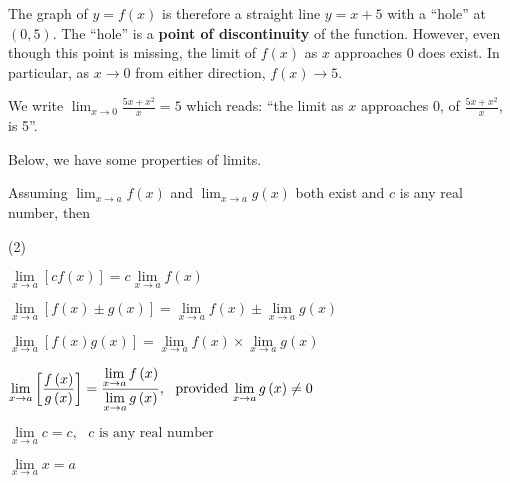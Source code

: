 \documentclass[11pt,a4paper]{book}
\begin{document}
The graph of $y=f\left(x\right)$ is therefore a straight line $y=x+5$
with a ``hole'' at $\left(0,5\right)$. The ``hole'' is a \textbf{point
of discontinuity} of the function.
However, even though this point is missing, the limit of $f\left(x\right)$
as $x$ approaches $0$ does exist. In particular, as $x\to0$ from
either direction, $f\left(x\right)\rightarrow5$.

We write ${\displaystyle \lim_{x\to0}\frac{5x+x^{2}}{x}=5}$ which
reads: ``the limit as $x$ approaches 0, of  ${\displaystyle \frac{5x+x^{2}}{x}}$, is 5''.

Below, we have some properties of limits.


\begin{tcolorbox}[colback=blue!5, colframe=black, boxrule=.4pt, sharpish corners]


Assuming ${\displaystyle \lim_{x\rightarrow a}f\left(x\right)}$ and
${\displaystyle \lim_{x\rightarrow a}g\left(x\right)}$ both exist
and $c$ is any real number, then

\begin{tasks}[style=itemize,label-width=3.5ex](2)

\task  $\mathop{\lim}\limits _{x\to a}\left[{cf\left(x\right)}\right]=c\mathop{\lim}\limits _{x\to a}f\left(x\right)$

\task  $\mathop{\lim}\limits _{x\to a}\left[{f\left(x\right)\pm g\left(x\right)}\right]=\mathop{\lim}\limits _{x\to a}f\left(x\right)\pm\mathop{\lim}\limits _{x\to a}g\left(x\right)$

\task  $\mathop{\lim}\limits _{x\to a}\left[{f\left(x\right)g\left(x\right)}\right]=\mathop{\lim}\limits _{x\to a}f\left(x\right)\times\mathop{\lim}\limits _{x\to a}g\left(x\right)$

\task ${\displaystyle \mathop{\lim}\limits _{x\to a}\left[{\frac{{f\left(x\right)}}{{g\left(x\right)}}}\right]=\frac{{\mathop{\lim}\limits _{x\to a}f\left(x\right)}}{{\mathop{\lim}\limits _{x\to a}g\left(x\right)}}{\rm {,}}\,\,\,\,\,{\rm {provided}}\,\mathop{\lim}\limits _{x\to a}g\left(x\right)\ne0}$

\task  $\mathop{\lim}\limits _{x\to a}c=c,\,\,\,\,c{\mbox{ is any real number}}$

\task  $\mathop{\lim}\limits _{x\to a}x=a$

\end{tasks}

\end{tcolorbox}
\end{document}
